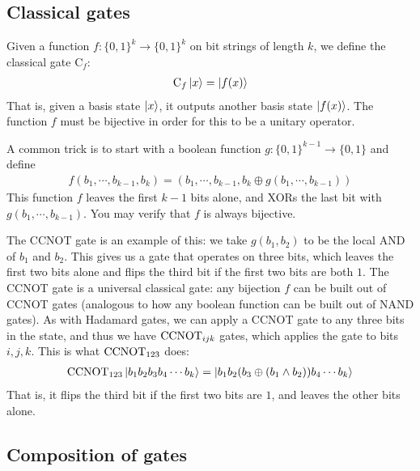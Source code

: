 \subsection{Classical gates}

\newcommand{\Cl}{\mathrm{C}}

Given a function $f : \{0,1\}^k \to \{0,1\}^k$ on bit strings of length $k$, we define the classical gate $\Cl_f$:
\begin{align}
  \Cl_f \ket{x} = \ket{f(x)}         \label{eqn:classicalgate}
\end{align}
That is, given a basis state $\ket{x}$, it outputs another basis state $\ket{f(x)}$.
The function $f$ must be bijective in order for this to be a unitary operator.

A common trick is to start with a boolean function $g : \{0,1\}^{k-1} \to \{0,1\}$ and define
\begin{align}
  f(b_1,\cdots,b_{k-1},b_k) = (b_1,\cdots,b_{k-1}, b_k \oplus g(b_1,\cdots,b_{k-1}))     \label{eqn:xortrick}
\end{align}
This function $f$ leaves the first $k-1$ bits alone, and XORs the last bit with $g(b_1,\cdots,b_{k-1})$.
You may verify that $f$ is always bijective.

The CCNOT gate is an example of this: we take $g(b_1,b_2)$ to be the local AND of $b_1$ and $b_2$.
This gives us a gate that operates on three bits, which leaves the first two bits alone and flips the third bit if the first two bits are both $1$.
The CCNOT gate is a universal classical gate: any bijection $f$ can be built out of CCNOT gates (analogous to how any boolean function can be built out of NAND gates).
As with Hadamard gates, we can apply a CCNOT gate to any three bits in the state, and thus we have $\mathrm{CCNOT}_{ijk}$ gates,
which applies the gate to bits $i,j,k$. This is what $\mathrm{CCNOT}_{123}$ does:
\begin{align*}
  \mathrm{CCNOT}_{123} \ket{b_1 b_2 b_3 b_4 \cdots b_k} = \ket{b_1 b_2 (b_3 \oplus (b_1 \wedge b_2)) b_4 \cdots b_k}
\end{align*}
That is, it flips the third bit if the first two bits are $1$, and leaves the other bits alone.

\subsection{Composition of gates}

